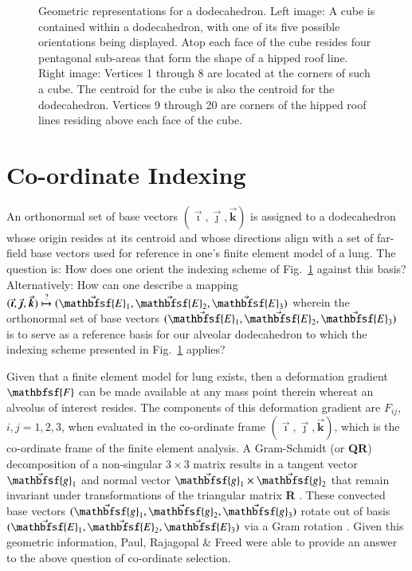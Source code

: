\begin{figure}
{		\par}
	\caption{Geometric representations for a dodecahedron.  Left image:  A cube is contained within a dodecahedron, with one of its five possible orientations being displayed.  Atop each face of the cube resides four pentagonal sub-areas that form the shape of a hipped roof line.  Right image:  Vertices 1 through 8 are located at the corners of such a cube.  The centroid for the cube is also the centroid for the dodecahedron.  Vertices 9 through 20 are corners of the hipped roof lines residing above each face of the cube.}
	\label{figDodecahedron}
\end{figure}

\section{Co-ordinate Indexing}
\label{reindexing3D}

An orthonormal set of base vectors $( \vec{\boldsymbol{\imath}} , \vec{\boldsymbol{\jmath}} , \vec{\boldsymbol{k}} )$ is assigned to a dodecahedron whose origin resides at its centroid and whose directions align with a set of far-field base vectors used for reference in one's finite element model of a lung.  The question is: How does one orient the indexing scheme of Fig.~\ref{figDodecahedron} against this basis?  Alternatively:  How can one describe a mapping $( \vec{\boldsymbol{\imath}} , \vec{\boldsymbol{\jmath}} , \vec{\boldsymbol{k}} ) \overset{\text{?}}{\mapsto} ( \vec{\mathbfsf{E}}_1 , \vec{\mathbfsf{E}}_2 , \vec{\mathbfsf{E}}_3 )$ wherein the ortho\-normal set of base vectors $( \vec{\mathbfsf{E}}_1 , \vec{\mathbfsf{E}}_2 , \vec{\mathbfsf{E}}_3 )$ is to serve as a reference basis for our alveolar dodecahedron to which the indexing scheme presented in Fig.~\ref{figDodecahedron} applies?

Given that a finite element model for lung exists, then a deformation gradient $\mathbfsf{F}$ can be made available at any mass point therein whereat an alveolus of interest resides.  The components of this deformation gradient are $F_{ij}$, $i, j = 1,2,3$, when evaluated in the co-ordinate frame $( \vec{\boldsymbol{\imath}} , \vec{\boldsymbol{\jmath}} , \vec{\boldsymbol{k}} )$, which is the co-ordinate frame of the finite element analysis.  A Gram-Schmidt (or \textbf{QR}) decomposition of a non-singular $3 \! \times \! 3$ matrix results in a tangent vector $\vec{\mathbfsf{g}}_1$ and normal vector $\vec{\mathbfsf{g}}_1 \times \vec{\mathbfsf{g}}_2$ that remain invariant under transformations of the triangular matrix \textbf{R} \cite{McLellan80}.  These convected base vectors $( \vec{\mathbfsf{g}}_1 , \vec{\mathbfsf{g}}_2 , \vec{\mathbfsf{g}}_3 )$ rotate out of basis $( \vec{\mathbfsf{E}}_1 , \vec{\mathbfsf{E}}_2 , \vec{\mathbfsf{E}}_3 )$ via a Gram rotation \cite{FreedZamani18}.  Given this geometric information, Paul, Rajagopal \& Freed \cite{Pauletal20} were able to provide an answer to the above question of co-ordinate selection.

